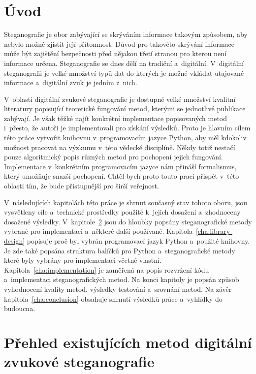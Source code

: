\chapter{Úvod}
\label{cha:introduction}

Steganografie je obor zabývající se skrýváním informace takovým způsobem, aby
nebylo možné zjistit její přítomnost. Důvod pro takovéto skrývání informace
může být zajištění bezpečnosti před nějakou třetí stranou pro kterou není
informace určena. Steganografie se dnes dělí na tradiční a~digitální.
V~digitální steganografii je velké množství typů dat do kterých je možné vkládat
utajované informace a~digitální zvuk je jedním z~nich.

V~oblasti digitální zvukové steganografie je dostupné velké množství kvalitní
literatury popisující teoretické fungování metod, kterými se jednotlivé
publikace zabývají. Je však těžké najít konkrétní implementace popisovaných
metod i~přesto, že autoři je implementovali pro získání výsledků. Proto je
hlavním cílem této práce vytvořit knihovnu v~programovacím jazyce Python, aby
měl kdokoliv možnost pracovat na výzkumu v~této vědecké disciplíně. Někdy totiž
nestačí pouze algoritmický popis různých metod pro pochopení jejich fungování.
Implementace v~konkrétním programovacím jazyce nám přináší formalismus, který
umožňuje snazší pochopení. Chtěl bych proto touto prací přispět v~této oblasti
tím, že bude přístupnější pro širší veřejnost.

V~následujících kapitolách této práce je shrnut současný stav tohoto oboru,
jsou vysvětleny cíle a~technické prostředky použité k~jejich dosažení
a~zhodnoceny dosažené výsledky. V~kapitole~\ref{cha:existing-methods}
 jsou do hloubky
popsány steganografické metody vybrané pro implementaci a~některé další
používané. Kapitola~\ref{cha:library-design} popisuje proč byl vybrán
programovací jazyk Python a~použité knihovny. Je zde také popsána struktura
balíčků pro Python a~steganografické metody které byly vybrány pro implementaci
včetně vlastní. Kapitola~\ref{cha:implementation} je zaměřená na popis
rozvržení kódu a~implementaci steganografických metod. Na konci kapitoly je
popsán způsob vyhodnocení kvality metod, výsledky testování a~srovnání metod.
Na závěr kapitola~\ref{cha:conclusion} obsahuje shrnutí výsledků práce
a~vyhlídky do budoucna.


\chapter{Přehled existujících metod digitální zvukové steganografie}
\label{cha:existing-methods}

